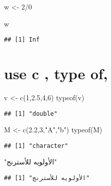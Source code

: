 \documentclass[
]{article}
\newenvironment{Shaded}{\begin{snugshade}}{\end{snugshade}}
\newcommand{\DecValTok}[1]{\textcolor[rgb]{0.00,0.00,0.81}{#1}}
\newcommand{\FloatTok}[1]{\textcolor[rgb]{0.00,0.00,0.81}{#1}}
\newcommand{\FunctionTok}[1]{\textcolor[rgb]{0.00,0.00,0.00}{#1}}
\newcommand{\NormalTok}[1]{#1}
\newcommand{\OtherTok}[1]{\textcolor[rgb]{0.56,0.35,0.01}{#1}}
\newcommand{\SpecialCharTok}[1]{\textcolor[rgb]{0.00,0.00,0.00}{#1}}
\newcommand{\StringTok}[1]{\textcolor[rgb]{0.31,0.60,0.02}{#1}}
\begin{document}
\begin{Shaded}
\begin{Highlighting}[]
\NormalTok{w }\OtherTok{\textless{}{-}} \DecValTok{2}\SpecialCharTok{/}\DecValTok{0}

\NormalTok{w}
\end{Highlighting}
\end{Shaded}

\begin{verbatim}
## [1] Inf
\end{verbatim}

\hypertarget{use-c-type-of}{%
\section{use c , type of,}\label{use-c-type-of}}

\begin{Shaded}
\begin{Highlighting}[]
\NormalTok{v }\OtherTok{\textless{}{-}} \FunctionTok{c}\NormalTok{(}\DecValTok{1}\NormalTok{,}\FloatTok{2.5}\NormalTok{,}\DecValTok{4}\NormalTok{,}\DecValTok{6}\NormalTok{)}
\FunctionTok{typeof}\NormalTok{(v)}
\end{Highlighting}
\end{Shaded}

\begin{verbatim}
## [1] "double"
\end{verbatim}

\begin{Shaded}
\begin{Highlighting}[]
\NormalTok{M }\OtherTok{\textless{}{-}} \FunctionTok{c}\NormalTok{(}\FloatTok{2.2}\NormalTok{,}\DecValTok{3}\NormalTok{,}\StringTok{"A"}\NormalTok{,}\StringTok{"b"}\NormalTok{)}
\FunctionTok{typeof}\NormalTok{(M)}
\end{Highlighting}
\end{Shaded}

\begin{verbatim}
## [1] "character"
\end{verbatim}

\begin{Shaded}
\begin{Highlighting}[]
\StringTok{"الأولويه للأسترنج"}
\end{Highlighting}
\end{Shaded}

\begin{verbatim}
## [1] "الأولويه للأسترنج"
\end{verbatim}
\end{document}
